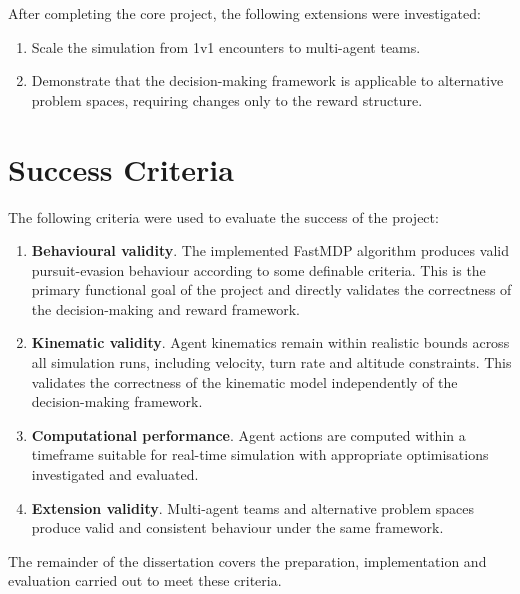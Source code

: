After completing the core project, the following extensions were investigated:

\begin{enumerate}
    \item Scale the simulation from 1v1 encounters to multi-agent teams.
    \item Demonstrate that the decision-making framework is applicable to alternative problem spaces, requiring changes only to the reward structure.
\end{enumerate}

\section{Success Criteria}
\label{sec:1.3}
The following criteria were used to evaluate the success of the project:
\begin{enumerate}
    \item \textbf{Behavioural validity}. The implemented FastMDP algorithm produces valid pursuit-evasion behaviour according to some definable criteria. This is the primary functional goal of the project and directly validates the correctness of the decision-making and reward framework.
    \item \textbf{Kinematic validity}. Agent kinematics remain within realistic bounds across all simulation runs, including velocity, turn rate and altitude constraints. This validates the correctness of the kinematic model independently of the decision-making framework.
    \item \textbf{Computational performance}. Agent actions are computed within a timeframe suitable for real-time simulation with appropriate optimisations investigated and evaluated.
    \item \textbf{Extension validity}. Multi-agent teams and alternative problem spaces produce valid and consistent behaviour under the same framework.
\end{enumerate}

The remainder of the dissertation covers the preparation, implementation and evaluation carried out to meet these criteria.
